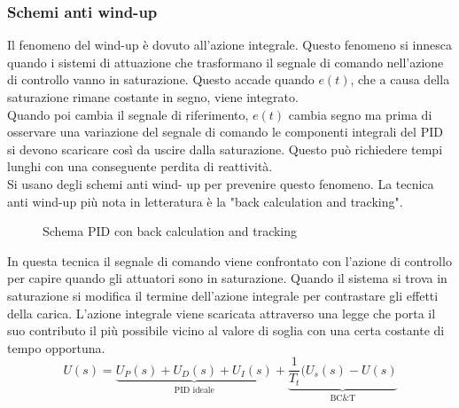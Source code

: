 \subsubsection{Schemi anti wind-up}
Il fenomeno del wind-up è dovuto all’azione integrale. Questo fenomeno si innesca quando i sistemi di attuazione che trasformano il segnale di comando nell’azione di controllo vanno in saturazione. Questo accade quando $e(t)$, che a causa della saturazione  rimane costante in segno, viene integrato.\\
Quando poi cambia il segnale di riferimento, $e(t)$ cambia segno ma prima di osservare una variazione del segnale di comando le componenti integrali del PID si devono scaricare così da uscire dalla saturazione. Questo può richiedere tempi lunghi con una conseguente perdita di reattività. \\
Si usano degli schemi anti wind- up per prevenire questo fenomeno. La tecnica anti wind-up più nota in letteratura  è la  "back calculation and tracking". \\
    \begin{figure} [H]
    \centering
    \fontsize{8}{10}\selectfont
    
    \caption{Schema PID con back calculation and tracking}
    \label{img:antiwindup}
\end{figure}
In questa tecnica il segnale di comando viene confrontato con l'azione di controllo per capire quando gli attuatori sono in saturazione. Quando il sistema si trova in saturazione si modifica il termine dell'azione integrale per contrastare gli effetti della carica. L'azione integrale viene scaricata attraverso una legge che porta il suo contributo il più possibile vicino al valore di soglia con una certa costante di tempo opportuna.
\begin{equation}
U(s)=\underbrace{U_P(s)+U_D(s)+U_I(s)}_\text{PID ideale}+\underbrace{\frac{1}{T_t}(U_s(s)-U(s)}_\text{BC\&T}
\end{equation}
